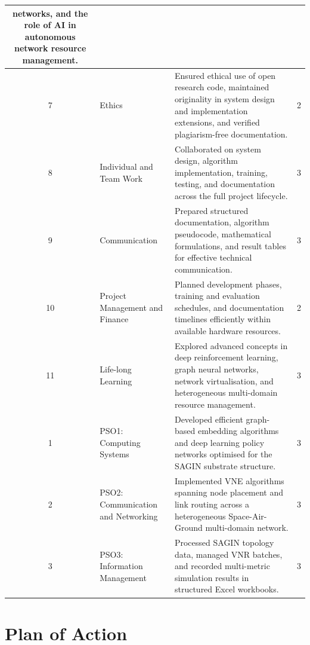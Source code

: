 \documentclass[12pt,a4paper]{report}
\begin{document}
\begin{center}
\begin{longtable}{|c|>{\centering\arraybackslash}m{2.6cm}|>{\centering\arraybackslash}m{7cm}|c|}
networks, and the role of AI in autonomous network resource management. & 3 \\
\hline
7 & Ethics &
Ensured ethical use of open research code, maintained originality in system design and
implementation extensions, and verified plagiarism-free documentation. & 2 \\
\hline
8 & Individual and Team Work &
Collaborated on system design, algorithm implementation, training, testing, and documentation
across the full project lifecycle. & 3 \\
\hline
9 & Communication &
Prepared structured documentation, algorithm pseudocode, mathematical formulations, and result
tables for effective technical communication. & 3 \\
\hline
10 & Project Management and Finance &
Planned development phases, training and evaluation schedules, and documentation timelines
efficiently within available hardware resources. & 2 \\
\hline
11 & Life-long Learning &
Explored advanced concepts in deep reinforcement learning, graph neural networks, network
virtualisation, and heterogeneous multi-domain resource management. & 3 \\
\hline
1 & PSO1: Computing Systems &
Developed efficient graph-based embedding algorithms and deep learning policy networks
optimised for the SAGIN substrate structure. & 3 \\
\hline
2 & PSO2: Communication and Networking &
Implemented VNE algorithms spanning node placement and link routing across a heterogeneous
Space-Air-Ground multi-domain network. & 3 \\
\hline
3 & PSO3: Information Management &
Processed SAGIN topology data, managed VNR batches, and recorded multi-metric simulation
results in structured Excel workbooks. & 3 \\
\hline
\end{longtable}
\end{center}

\chapter{Plan of Action}
\label{app:plan}
\end{document}

